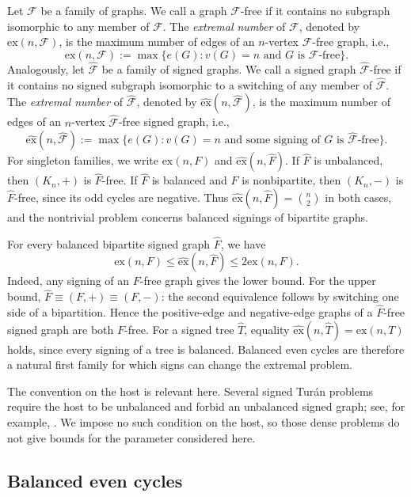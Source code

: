\documentclass{article}
\newcommand{\ex}{\mathrm{ex}}
\newcommand{\hex}{\widehat{\ex}}
\theoremstyle{definition}
\theoremstyle{remark}
\begin{document}
Let $\mathcal F$ be a family of graphs. We call a graph $\mathcal F$-free
if it contains no subgraph isomorphic to any member of $\mathcal F$.
The \emph{extremal number} of $\mathcal F$, denoted by $\ex(n,\mathcal F)$,
is the maximum number of edges of an $n$-vertex $\mathcal F$-free graph, i.e.,
\[
\ex(n,\mathcal F):=\max\bigl\{e(G):v(G)=n\text{ and $G$ is $\mathcal F$-free}\bigr\}.
\]
Analogously, let $\widehat{\mathcal F}$ be a family of signed graphs.
We call a signed graph $\widehat{\mathcal F}$-free if it contains no
signed subgraph isomorphic to a switching of any member of
$\widehat{\mathcal F}$. The \emph{extremal number} of
$\widehat{\mathcal F}$, denoted by $\hex(n,\widehat{\mathcal F})$, is the
maximum number of edges of an $n$-vertex $\widehat{\mathcal F}$-free signed
graph, i.e.,
\[
\hex(n,\widehat{\mathcal F}):=
\max\bigl\{e(G):v(G)=n\text{ and some signing of $G$ is $\widehat{\mathcal F}$-free}\bigr\}.
\]
For singleton families, we write $\ex(n,F)$ and $\hex(n,\widehat F)$.
If $\widehat F$ is unbalanced, then $(K_n,+)$ is
$\widehat F$-free.  If $\widehat F$ is balanced and $F$ is nonbipartite,
then $(K_n,-)$ is $\widehat F$-free, since its odd cycles are negative.
Thus $\hex(n,\widehat F)=\binom n2$ in both cases, and the nontrivial
problem concerns balanced signings of bipartite graphs.

For every balanced bipartite signed graph $\widehat F$, we have
\begin{equation}\label{eq:intro-comparison}
\ex(n,F)\leq\hex(n,\widehat F)\leq2\ex(n,F).
\end{equation}
Indeed, any signing of an $F$-free graph gives the lower bound.  For the
upper bound, $\widehat F\equiv(F,+)\equiv(F,-)$: the second equivalence
follows by switching one side of a bipartition.  Hence the positive-edge
and negative-edge graphs of a $\widehat F$-free signed graph are both
$F$-free.  For a signed tree $\widehat T$, equality
$\hex(n,\widehat T)=\ex(n,T)$ holds, since every signing of a tree is
balanced.  Balanced even cycles are therefore a natural first family for
which signs can change the extremal problem.

The convention on the host is relevant here.  Several signed Tur\'an
problems require the host to be unbalanced and forbid an unbalanced signed
graph; see, for example, \cite{WangHouLi2024}.  We impose no such condition
on the host, so those dense problems do not give bounds for the parameter
considered here.

\subsection{Balanced even cycles}
\end{document}
